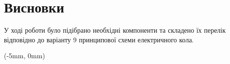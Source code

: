 \documentclass[a4paper]{article}
\begin{document}
\section*{Висновки}
У ході роботи було підібрано необхідні компоненти та складено їх перелік відповідно до варіанту 9 принципової схеми електричного кола.

\newpage
\fancyfoot[C]{}

\begin{textblock*}{\paperwidth}(-5mm, 0mm)
\end{textblock*}
\end{document}
